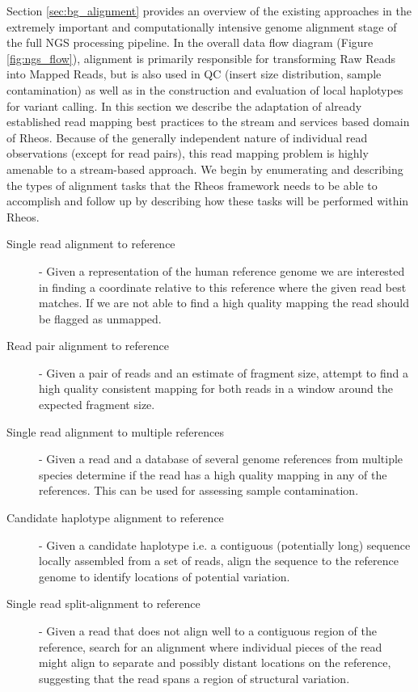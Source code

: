Section \ref{sec:bg_alignment} provides an overview of the existing approaches in the extremely important and computationally intensive genome alignment stage of the full NGS processing pipeline. In the overall data flow diagram (Figure \ref{fig:ngs_flow}), alignment is primarily responsible for transforming Raw Reads into Mapped Reads, but is also used in QC (insert size distribution, sample contamination) as well as in the construction and evaluation of local haplotypes for variant calling. In this section we describe the adaptation of already established read mapping best practices to the stream and services based domain of Rheos. Because of the generally independent nature of individual read observations (except for read pairs), this read mapping problem is highly amenable to a stream-based approach. We begin by enumerating and describing the types of alignment tasks that the Rheos framework needs to be able to accomplish and follow up by describing how these tasks will be performed within Rheos.
\newpage
\begin{description}
    \item [Single read alignment to reference] - Given a representation of the human reference genome we are interested in finding a coordinate relative to this reference where the given read best matches. If we are not able to find a high quality mapping the read should be flagged as unmapped.
    \item [Read pair alignment to reference] - Given a pair of reads and an estimate of fragment size, attempt to find a high quality consistent mapping for both reads in a window around the expected fragment size.
    \item [Single read alignment to multiple references] - Given a read and a database of several genome references from multiple species determine if the read has a high quality mapping in any of the references. This can be used for assessing sample contamination.
    \item [Candidate haplotype alignment to reference] - Given a candidate haplotype i.e. a contiguous (potentially long) sequence locally assembled from a set of reads, align the sequence to the reference genome to identify locations of potential variation.
    \item [Single read split-alignment to reference] - Given a read that does not align well to a contiguous region of the reference, search for an alignment where individual pieces of the read might align to separate and possibly distant locations on the reference, suggesting that the read spans a region of structural variation.
\end{description}

